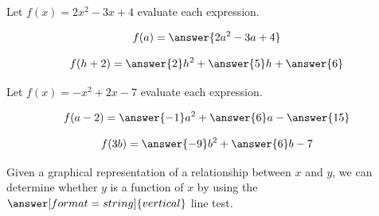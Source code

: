 \documentclass{ximera}
\begin{document}
\begin{problem}\label{prob:160hom1prob6}
Let $f(x)=2x^2-3x+4$ evaluate each expression.

$$f(a)=\answer{2a^2-3a+4}$$

$$f(h+2)=\answer{2}h^2+\answer{5}h+\answer{6}$$
\end{problem}

\begin{problem}\label{prob:160hom1prob7}
Let $f(x)=-x^2+2x-7$ evaluate each expression.

$$f(a-2)=\answer{-1}a^2+\answer{6}a-\answer{15}$$

$$f(3b)=\answer{-9}b^2+\answer{6}b-7$$
\end{problem}

\begin{problem}\label{prob:160hom1prob8}
Given a graphical representation of a relationship between $x$ and $y$, we can determine whether $y$ is a function of $x$ by using the $\answer[format=string]{vertical}$ line test.
\end{problem}
\end{document}
